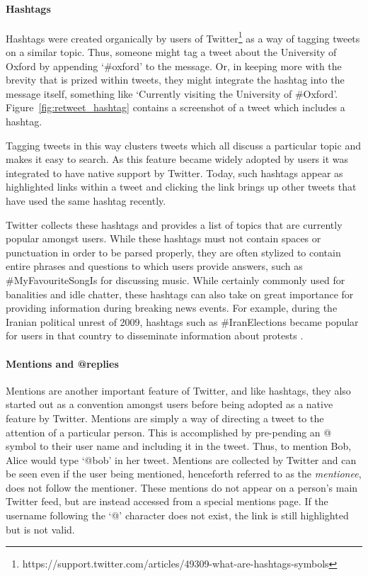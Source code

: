 \paragraph{Hashtags}

Hashtags were created organically by users of Twitter\footnote{https://support.twitter.com/articles/49309-what-are-hashtags-symbols} as a way of tagging tweets on a similar topic. Thus, someone might tag a tweet about the University of Oxford by appending `\#oxford' to the message. Or, in keeping more with the brevity that is prized within tweets, they might integrate the hashtag into the message itself, something like `Currently visiting the University of \#Oxford'. Figure~\ref{fig:retweet_hashtag} contains a screenshot of a tweet which includes a hashtag.

Tagging tweets in this way clusters tweets which all discuss a particular topic and makes it easy to search. As this feature became widely adopted by users it was integrated to have native support by Twitter. Today, such hashtags appear as highlighted links within a tweet and clicking the link brings up other tweets that have used the same hashtag recently.

Twitter collects these hashtags and provides a list of topics that are currently popular amongst users. While these hashtags must not contain spaces or punctuation in order to be parsed properly, they are often stylized to contain entire phrases and questions to which users provide answers, such as \#MyFavouriteSongIs for discussing music. While certainly commonly used for banalities and idle chatter, these hashtags can also take on great importance for providing information during breaking news events. For example, during the Iranian political unrest of 2009, hashtags such as \#IranElections became popular for users in that country to disseminate information about protests \cite{Cha2010}.


\paragraph{Mentions and @replies}

Mentions are another important feature of Twitter, and like hashtags, they also started out as a convention amongst users before being adopted as a native feature by Twitter\cite{Java2007}. Mentions are simply a way of directing a tweet to the attention of a particular person. This is accomplished by pre-pending an @ symbol to their user name and including it in the tweet. Thus, to mention Bob, Alice would type `@bob' in her tweet. Mentions are collected by Twitter and can be seen even if the user being mentioned, henceforth referred to as the \emph{mentionee}, does not follow the mentioner. These mentions do not appear on a person's main Twitter feed, but are instead accessed from a special mentions page. If the username following the `@' character does not exist, the link is still highlighted but is not valid.


